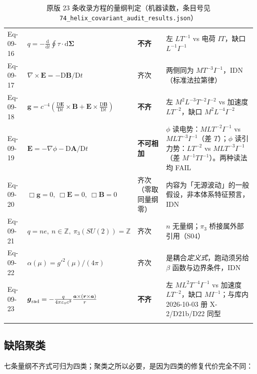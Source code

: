 \documentclass[UTF8,fontset=fandol,11pt]{ctexart}
\newcommand{\dd}{\mathrm{d}}
\newcommand{\DD}{\mathrm{D}}
\newcommand{\bx}{\boldsymbol}
\newcommand{\code}[1]{\texttt{#1}}
\begin{document}
\begin{longtable}{p{1.5cm}p{5.4cm}p{3.0cm}p{6.0cm}}
Eq-09-16 & $q=-\frac{\dd}{\dd t}\oint\tau\cdot\dd\bx\Sigma$ & \textbf{不齐} & 左 $LT^{-1}$ vs 电荷 $IT$，缺口 $L^{-1}I^{-1}$ \\
Eq-09-17 & $\nabla\times\bx E=-\DD\bx B/\DD t$ & 齐次 & 两侧同为 $MT^{-3}I^{-1}$，IDN（标准法拉第律） \\
Eq-09-18 & $\bx g=c^{-4}\left(\frac{\DD\bx E}{\DD t}\times\bx B+\bx E\times\frac{\DD\bx B}{\DD t}\right)$ & \textbf{不齐} & 左 $M^2L^{-3}T^{-2}I^{-2}$ vs 加速度 $LT^{-2}$，缺口 $M^2L^{-4}I^{-2}$ \\
Eq-09-19 & $\bx E=-\nabla\phi-\DD\bx A/\DD t$ & \textbf{不可相加} & $\phi$ 读电势：$MLT^{-2}I^{-1}$ vs $MLT^{-3}I^{-1}$（差 $T$）；$\phi$ 读引力势：$LT^{-2}$ vs $MLT^{-3}I^{-1}$（差 $M^{-1}TI^{-1}$）。两种读法均 FAIL \\
Eq-09-20 & $\Box\bx g=0,\ \Box\bx E=0,\ \Box\bx B=0$ & 齐次（零取同量纲零） & 内容为「无源波动」的一般假设，非本体系特征预言，IDN \\
Eq-09-21 & $q=ne,\ n\in\mathbb Z,\ \pi_3(SU(2))=\mathbb Z$ & 齐次 & $n$ 无量纲；$\pi_3$ 桥接属外部引用（S04） \\
Eq-09-22 & $\alpha(\mu)=g'^2(\mu)/(4\pi)$ & 齐次 & 是耦合\emph{定义式}，跑动须另给 $\beta$ 函数与边界条件，IDN \\
Eq-09-23 & $\bx g_{\rm rad}=-\frac{q}{4\pi\varepsilon_0c^3}\frac{\bx a\times(\bx r\times\bx a)}{r}$ & \textbf{不齐} & 左 $ML^2T^{-4}I^{-1}$ vs 加速度 $LT^{-2}$，缺口 $M I^{-1}$；与库内 2026-10-03 册 X-2/D21b/D22 同型 \\
\bottomrule
\caption{原版 23 条收录方程的量纲判定（机器读数，条目号见 \code{74\_helix\_covariant\_audit\_results.json}）}
\end{longtable}

\subsection{缺陷聚类}
七条量纲不齐式可归为四类；聚类之所以必要，是因为四类的修复代价完全不同：
\end{document}
